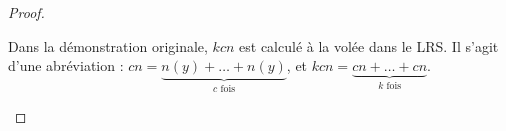 \begin{appendices}
\begin{proof}
			\espace
			
			
			
			\begin{remark}
				Dans la démonstration originale, $kcn$ est calculé à la volée dans le LRS. Il s'agit d'une abréviation : $cn = \underset{c \text{ fois}}{\underbrace{n(y) + \dots + n(y)}}$, et $kcn = \underset{k \text{ fois}}{\underbrace{cn + \dots + cn}}$. 
				

\end{remark}
\end{proof}
\end{appendices}
